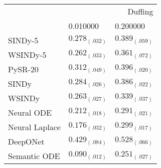 \begin{tabular}{lll}
\toprule
 & \multicolumn{2}{r}{Duffing} \\
 & 0.010000 & 0.200000 \\
\midrule
SINDy-5 & $0.278_{(.032)}$ & $0.389_{(.059)}$ \\
WSINDy-5 & $0.262_{(.033)}$ & $0.361_{(.072)}$ \\
PySR-20 & $0.312_{(.049)}$ & $0.396_{(.020)}$ \\
SINDy & $0.284_{(.026)}$ & $0.386_{(.022)}$ \\
WSINDy & $0.263_{(.027)}$ & $0.339_{(.037)}$ \\
Neural ODE & $0.212_{(.018)}$ & $0.291_{(.021)}$ \\
Neural Laplace & $0.176_{(.032)}$ & $0.299_{(.017)}$ \\
DeepONet & $0.429_{(.084)}$ & $0.528_{(.066)}$ \\
Semantic ODE & $0.090_{(.012)}$ & $0.251_{(.027)}$ \\
\bottomrule
\end{tabular}
